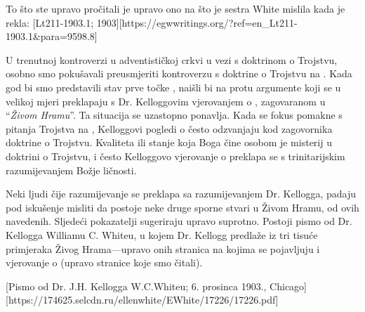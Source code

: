 To što ste upravo pročitali je upravo ono na što je sestra White mislila kada je rekla: [Lt211-1903.1; 1903][https://egwwritings.org/?ref=en\_Lt211-1903.1&para=9598.8]

U trenutnoj kontroverzi u adventističkoj crkvi u vezi s doktrinom o Trojstvu, osobno smo pokušavali preusmjeriti kontroverzu s doktrine o Trojstvu na . Kada god bi smo predstavili stav prve točke , naišli bi na protu argumente koji se u velikoj mjeri preklapaju s Dr. Kelloggovim vjerovanjem o , zagovaranom u “\textit{Živom Hramu}”. Ta situacija se uzastopno ponavlja. Kada se fokus pomakne s pitanja Trojstva na , Kelloggovi pogledi o  često odzvanjaju kod zagovornika doktrine o Trojstvu. Kvaliteta ili stanje koja Boga čine osobom je misterij u doktrini o Trojstvu, i često Kelloggovo vjerovanje o  preklapa se s trinitarijskim razumijevanjem Božje ličnosti.

Neki ljudi čije razumijevanje  se preklapa sa razumijevanjem Dr. Kellogga, padaju pod iskušenje misliti da postoje neke druge sporne stvari u Živom Hramu, od ovih navedenih. Sljedeći pokazatelji sugeriraju upravo suprotno. Postoji pismo od Dr. Kellogga Williamu C. Whiteu, u kojem Dr. Kellogg predlaže  iz tri tisuće primjeraka Živog Hrama—upravo onih stranica na kojima se pojavljuju  i vjerovanje o  (upravo stranice koje smo čitali).

[Pismo od Dr. J.H. Kellogga W.C.Whiteu; 6. prosinca 1903., Chicago][https://174625.selcdn.ru/ellenwhite/EWhite/17226/17226.pdf]


